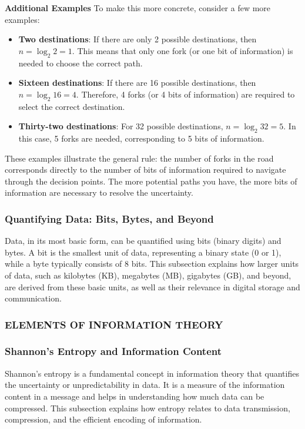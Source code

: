 \documentclass[12pt, oneside]{book}
\begin{document}
\textbf{Additional Examples}
To make this more concrete, consider a few more examples:
\begin{itemize}
		\item \textbf{Two destinations}: If there are only 2 possible destinations, then \(n = \log_2 2 = 1\). This means that only one fork (or one bit of information) is needed to choose the correct path.
		\item \textbf{Sixteen destinations}:  If there are 16 possible destinations, then \(n = \log_2 16 = 4\). Therefore, 4 forks (or 4 bits of information) are required to select the correct destination.
		\item \textbf{Thirty-two destinations}: For 32 possible destinations, \(n = \log_2 32 = 5\). In this case, 5 forks are needed, corresponding to 5 bits of information.
\end{itemize}
These examples illustrate the general rule: the number of forks in the road corresponds directly to the number of bits of information required to navigate through the decision points. The more potential paths you have, the more bits of information are necessary to resolve the uncertainty.

\subsubsection{Quantifying Data: Bits, Bytes, and Beyond}
Data, in its most basic form, can be quantified using bits (binary digits) and bytes. A bit is the smallest unit of data, representing a binary state (0 or 1), while a byte typically consists of 8 bits. This subsection explains how larger units of data, such as kilobytes (KB), megabytes (MB), gigabytes (GB), and beyond, are derived from these basic units, as well as their relevance in digital storage and communication.

\subsubsection{ELEMENTS OF	INFORMATION THEORY}

\subsubsection{Shannon's Entropy and Information Content}
Shannon's entropy is a fundamental concept in information theory that quantifies the uncertainty or unpredictability in data. It is a measure of the information content in a message and helps in understanding how much data can be compressed. This subsection explains how entropy relates to data transmission, compression, and the efficient encoding of information.
\end{document}
